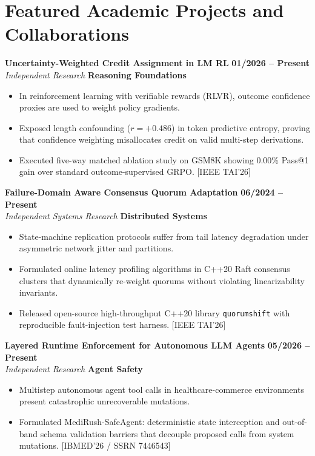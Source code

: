 \documentclass[10pt,letterpaper]{article}
\begin{document}
\section*{Featured Academic Projects and Collaborations}
\textbf{Uncertainty-Weighted Credit Assignment in LM RL} \hfill \textbf{01/2026 -- Present} \\
\textit{Independent Research} \hfill \textcolor{accent}{\textbf{Reasoning Foundations}}
\begin{itemize}
    \item In reinforcement learning with verifiable rewards (RLVR), outcome confidence proxies are used to weight policy gradients.
    \item Exposed length confounding ($r = +0.486$) in token predictive entropy, proving that confidence weighting misallocates credit on valid multi-step derivations.
    \item Executed five-way matched ablation study on GSM8K showing 0.00\% Pass@1 gain over standard outcome-supervised GRPO. [IEEE TAI'26]
\end{itemize}

\vspace{3pt}

\textbf{Failure-Domain Aware Consensus Quorum Adaptation} \hfill \textbf{06/2024 -- Present} \\
\textit{Independent Systems Research} \hfill \textcolor{accent}{\textbf{Distributed Systems}}
\begin{itemize}
    \item State-machine replication protocols suffer from tail latency degradation under asymmetric network jitter and partitions.
    \item Formulated online latency profiling algorithms in C++20 Raft consensus clusters that dynamically re-weight quorums without violating linearizability invariants.
    \item Released open-source high-throughput C++20 library \texttt{quorumshift} with reproducible fault-injection test harness. [IEEE TAI'26]
\end{itemize}

\vspace{3pt}

\textbf{Layered Runtime Enforcement for Autonomous LLM Agents} \hfill \textbf{05/2026 -- Present} \\
\textit{Independent Research} \hfill \textcolor{accent}{\textbf{Agent Safety}}
\begin{itemize}
    \item Multistep autonomous agent tool calls in healthcare-commerce environments present catastrophic unrecoverable mutations.
    \item Formulated MediRush-SafeAgent: deterministic state interception and out-of-band schema validation barriers that decouple proposed calls from system mutations. [IBMED'26 / SSRN 7446543]
\end{itemize}
\end{document}
